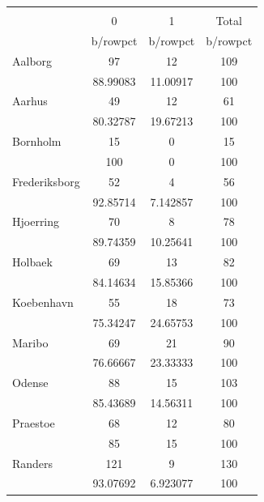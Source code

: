 {
\def\sym#1{\ifmmode^{#1}\else\(^{#1}\)\fi}
\begin{tabular}{l*{3}{c}}
\toprule
                    &\multicolumn{3}{c}{}                  \\
                    &           0&           1&       Total\\
                    &    b/rowpct&    b/rowpct&    b/rowpct\\
\midrule
Aalborg             &          97&          12&         109\\
                    &    88.99083&    11.00917&         100\\
Aarhus              &          49&          12&          61\\
                    &    80.32787&    19.67213&         100\\
Bornholm            &          15&           0&          15\\
                    &         100&           0&         100\\
Frederiksborg       &          52&           4&          56\\
                    &    92.85714&    7.142857&         100\\
Hjoerring           &          70&           8&          78\\
                    &    89.74359&    10.25641&         100\\
Holbaek             &          69&          13&          82\\
                    &    84.14634&    15.85366&         100\\
Koebenhavn          &          55&          18&          73\\
                    &    75.34247&    24.65753&         100\\
Maribo              &          69&          21&          90\\
                    &    76.66667&    23.33333&         100\\
Odense              &          88&          15&         103\\
                    &    85.43689&    14.56311&         100\\
Praestoe            &          68&          12&          80\\
                    &          85&          15&         100\\
Randers             &         121&           9&         130\\
                    &    93.07692&    6.923077&         100\\

\end{tabular}}
